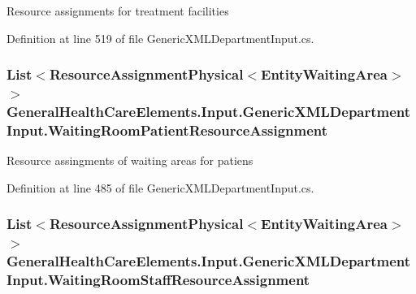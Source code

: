 Resource assignments for treatment facilities 



Definition at line 519 of file Generic\+X\+M\+L\+Department\+Input.\+cs.

\subsubsection[{\texorpdfstring{Waiting\+Room\+Patient\+Resource\+Assignment}{WaitingRoomPatientResourceAssignment}}]{\setlength{\rightskip}{0pt plus 5cm}List$<${\bf Resource\+Assignment\+Physical}$<${\bf Entity\+Waiting\+Area}$>$ $>$ General\+Health\+Care\+Elements.\+Input.\+Generic\+X\+M\+L\+Department\+Input.\+Waiting\+Room\+Patient\+Resource\+Assignment\hspace{0.3cm}{\ttfamily [get]}}\hypertarget{class_general_health_care_elements_1_1_input_1_1_generic_x_m_l_department_input_a2f33e87328a1fc59272a22c429a36017}{}\label{class_general_health_care_elements_1_1_input_1_1_generic_x_m_l_department_input_a2f33e87328a1fc59272a22c429a36017}


Resource assingments of waiting areas for patiens 



Definition at line 485 of file Generic\+X\+M\+L\+Department\+Input.\+cs.

\subsubsection[{\texorpdfstring{Waiting\+Room\+Staff\+Resource\+Assignment}{WaitingRoomStaffResourceAssignment}}]{\setlength{\rightskip}{0pt plus 5cm}List$<${\bf Resource\+Assignment\+Physical}$<${\bf Entity\+Waiting\+Area}$>$ $>$ General\+Health\+Care\+Elements.\+Input.\+Generic\+X\+M\+L\+Department\+Input.\+Waiting\+Room\+Staff\+Resource\+Assignment\hspace{0.3cm}{\ttfamily [get]}}\hypertarget{class_general_health_care_elements_1_1_input_1_1_generic_x_m_l_department_input_a208eac0212509c18ae7deb03feb26f55}{}\label{class_general_health_care_elements_1_1_input_1_1_generic_x_m_l_department_input_a208eac0212509c18ae7deb03feb26f55}


